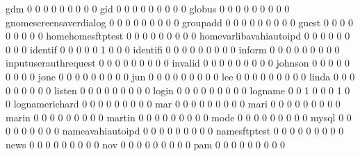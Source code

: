 \documentclass[compress,8pt]{beamer}
\begin{document}
\begin{frame}
\begin{Schunk}
  gdm                                        0   0   0   0   0   0   0   0   0
  gid                                        0   0   0   0   0   0   0   0   0
  globus                                     0   0   0   0   0   0   0   0   0
  gnomescreensaverdialog                     0   0   0   0   0   0   0   0   0
  groupadd                                   0   0   0   0   0   0   0   0   0
  guest                                      0   0   0   0   0   0   0   0   0
  homehomesftptest                           0   0   0   0   0   0   0   0   0
  homevarlibavahiautoipd                     0   0   0   0   0   0   0   0   0
  identif                                    0   0   0   0   0   1   0   0   0
  identifi                                   0   0   0   0   0   0   0   0   0
  inform                                     0   0   0   0   0   0   0   0   0
  inputuserauthrequest                       0   0   0   0   0   0   0   0   0
  invalid                                    0   0   0   0   0   0   0   0   0
  johnson                                    0   0   0   0   0   0   0   0   0
  jone                                       0   0   0   0   0   0   0   0   0
  jun                                        0   0   0   0   0   0   0   0   0
  lee                                        0   0   0   0   0   0   0   0   0
  linda                                      0   0   0   0   0   0   0   0   0
  listen                                     0   0   0   0   0   0   0   0   0
  login                                      0   0   0   0   0   0   0   0   0
  logname                                    0   0   1   0   0   0   1   0   0
  lognamerichard                             0   0   0   0   0   0   0   0   0
  mar                                        0   0   0   0   0   0   0   0   0
  mari                                       0   0   0   0   0   0   0   0   0
  marin                                      0   0   0   0   0   0   0   0   0
  martin                                     0   0   0   0   0   0   0   0   0
  mode                                       0   0   0   0   0   0   0   0   0
  mysql                                      0   0   0   0   0   0   0   0   0
  nameavahiautoipd                           0   0   0   0   0   0   0   0   0
  namesftptest                               0   0   0   0   0   0   0   0   0
  news                                       0   0   0   0   0   0   0   0   0
  nov                                        0   0   0   0   0   0   0   0   0
  pam                                        0   0   0   0   0   0   0   0   0

\end{Schunk}
\end{frame}
\end{document}
